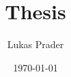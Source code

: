 \documentclass[11pt,a4paper]{article}
\begin{document}
\title{Thesis}
\author{Lukas Prader}
\date{\today}
\maketitle


\newpage
\printbibliography[]

\end{document}
